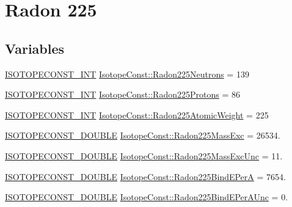\hypertarget{group___isotope_const-_radon-_rn225}{}\section{Radon 225}
\label{group___isotope_const-_radon-_rn225}
\subsection*{Variables}
\begin{DoxyCompactItemize}
\item 
\mbox{\hyperlink{group___isotope_const-_macros_ga5f18360b3e99483a35c32d789e62621c}{I\+S\+O\+T\+O\+P\+E\+C\+O\+N\+S\+T\+\_\+\+I\+NT}} \mbox{\hyperlink{group___isotope_const-_radon-_rn225_ga66e54f92500e77add02a679084bf9676}{Isotope\+Const\+::\+Radon225\+Neutrons}} = 139
\item 
\mbox{\hyperlink{group___isotope_const-_macros_ga5f18360b3e99483a35c32d789e62621c}{I\+S\+O\+T\+O\+P\+E\+C\+O\+N\+S\+T\+\_\+\+I\+NT}} \mbox{\hyperlink{group___isotope_const-_radon-_rn225_gae4da9d4892622ef3bee1c9f5fcb2ea32}{Isotope\+Const\+::\+Radon225\+Protons}} = 86
\item 
\mbox{\hyperlink{group___isotope_const-_macros_ga5f18360b3e99483a35c32d789e62621c}{I\+S\+O\+T\+O\+P\+E\+C\+O\+N\+S\+T\+\_\+\+I\+NT}} \mbox{\hyperlink{group___isotope_const-_radon-_rn225_gaff9bde3c0493c9322da565ad9e35b5e6}{Isotope\+Const\+::\+Radon225\+Atomic\+Weight}} = 225
\item 
\mbox{\hyperlink{group___isotope_const-_macros_ga8f45a7272ce02c0b4c65c44636ed719a}{I\+S\+O\+T\+O\+P\+E\+C\+O\+N\+S\+T\+\_\+\+D\+O\+U\+B\+LE}} \mbox{\hyperlink{group___isotope_const-_radon-_rn225_ga958b306cb0689799dbdaea12e158d012}{Isotope\+Const\+::\+Radon225\+Mass\+Exc}} = 26534.
\item 
\mbox{\hyperlink{group___isotope_const-_macros_ga8f45a7272ce02c0b4c65c44636ed719a}{I\+S\+O\+T\+O\+P\+E\+C\+O\+N\+S\+T\+\_\+\+D\+O\+U\+B\+LE}} \mbox{\hyperlink{group___isotope_const-_radon-_rn225_gac8e35c8af6606f28c7a2948f343224bc}{Isotope\+Const\+::\+Radon225\+Mass\+Exc\+Unc}} = 11.
\item 
\mbox{\hyperlink{group___isotope_const-_macros_ga8f45a7272ce02c0b4c65c44636ed719a}{I\+S\+O\+T\+O\+P\+E\+C\+O\+N\+S\+T\+\_\+\+D\+O\+U\+B\+LE}} \mbox{\hyperlink{group___isotope_const-_radon-_rn225_gac854d3e4fd43a9f81c980f03bca10695}{Isotope\+Const\+::\+Radon225\+Bind\+E\+PerA}} = 7654.
\item 
\mbox{\hyperlink{group___isotope_const-_macros_ga8f45a7272ce02c0b4c65c44636ed719a}{I\+S\+O\+T\+O\+P\+E\+C\+O\+N\+S\+T\+\_\+\+D\+O\+U\+B\+LE}} \mbox{\hyperlink{group___isotope_const-_radon-_rn225_ga209c499db48963580fc8ee62f09b0bcd}{Isotope\+Const\+::\+Radon225\+Bind\+E\+Per\+A\+Unc}} = 0.

\end{DoxyCompactItemize}
